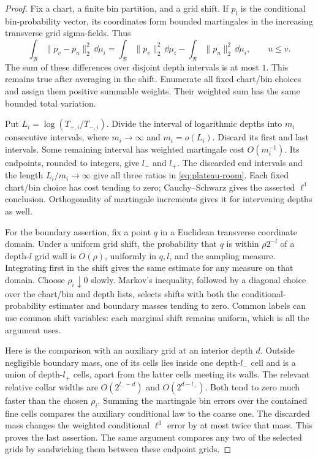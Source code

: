 \begin{proof}
Fix a chart, a finite bin partition, and a grid shift. If $p_l$ is the
conditional bin-probability vector, its coordinates form bounded
martingales in the increasing transverse grid sigma-fields. Thus
\[
 \int_{\mathcal B}\|p_v-p_u\|_2^2\,\dd\mu_i
 =\int_{\mathcal B}\|p_v\|_2^2\,\dd\mu_i
  -\int_{\mathcal B}\|p_u\|_2^2\,\dd\mu_i,
 \qquad u\le v.
\]
The sum of these differences over disjoint depth intervals is at most
$1$. This remains true after averaging in the shift. Enumerate all
fixed chart/bin choices and assign them positive summable weights.
Their weighted sum has the same bounded total variation.

Put $L_i=\log(T_{+,i}/T_{-,i})$. Divide the interval of logarithmic
depths into $m_i$ consecutive intervals, where $m_i\to\infty$ and
$m_i=o(L_i)$. Discard its first and last intervals. Some remaining
interval has weighted martingale cost $O(m_i^{-1})$. Its endpoints,
rounded to integers, give $l_-$ and $l_+$. The discarded end intervals
and the length $L_i/m_i\to\infty$ give all three ratios in
\eqref{eq:plateau-room}. Each fixed chart/bin choice has cost tending
to zero; Cauchy--Schwarz gives the asserted $\ell^1$ conclusion.
Orthogonality of martingale increments gives it for intervening
depths as well.

For the boundary assertion, fix a point $q$ in a Euclidean transverse
coordinate domain. Under a uniform grid shift, the probability that
$q$ is within $\rho 2^{-l}$ of a depth-$l$ grid wall is $O(\rho)$,
uniformly in $q,l$, and the sampling measure. Integrating first in
the shift gives the same estimate for any measure on that domain.
Choose $\rho_i\downarrow0$ slowly. Markov's inequality, followed by
a diagonal choice over the chart/bin and depth lists, selects shifts
with both the conditional-probability estimates and boundary masses
tending to zero. Common labels can use common shift variables:
each marginal shift remains uniform, which is all the argument uses.

Here is the comparison with an auxiliary grid at an interior depth
$d$. Outside negligible boundary mass, one of its cells lies inside
one depth-$l_-$ cell and is a union of depth-$l_+$ cells, apart from
the latter cells meeting its walls. The relevant relative collar
widths are $O(2^{l_--d})$ and $O(2^{d-l_+})$. Both tend to zero much
faster than the chosen $\rho_i$. Summing the martingale bin errors
over the contained fine cells compares the auxiliary conditional
law to the coarse one. The discarded mass changes the weighted
conditional $\ell^1$ error by at most twice that mass. This proves
the last assertion. The same argument compares any two of the
selected grids by sandwiching them between these endpoint grids.
\end{proof}

